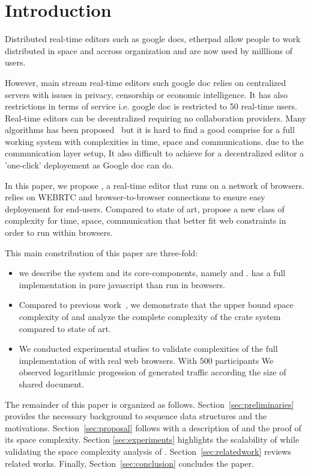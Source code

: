 
\section{Introduction}

Distributed real-time editors such as google docs, etherpad allow
people to work distributed in space and accross organization and are
now used by milllions of users. 

However, main stream real-time editors such google doc relies on
centralized servers with issues in privacy, censorship or economic
intelligence. It has also restrictions in terms of service i.e. google
doc is restricted to 50 real-time users. 
%
Real-time editors can be decentralized requiring no collaboration
providers. Many algorithms has been proposed~\cite{sun1998operational,
  sun2009contextbased,woot} but it is hard to find a good comprise for
a full working system with complexities in time, space and
communications. due to the communication layer setup, It also
difficult to achieve for a decentralized editor a 'one-click'
deployement as Google doc can do.

In this paper, we propose \CRATE, a real-time editor that runs on a
network of browsers. \CRATE relies on WEBRTC and browser-to-browser
connections to ensure easy deployement for end-users. Compared to
state of art, \CRATE propose a new class of complexity for time,
space, communication that better fit web constraints in order to run
within browsers.

This main constribution of this paper are three-fold:
\begin{itemize}
\item we describe the \CRATE system and its core-components, namely
  \LSEQ and \SPRAY. \CRATE has a full implementation in pure
  javascript than run in browsers.
\item Compared to previous work~\cite{doceng}, we
  demonstrate that the upper bound space complexity of \CRATE and
  analyze the complete complexity of the crate system compared to
  state of art.
\item We conducted experimental studies to validate complexities of
  the full implementation of \CRATE with real web browsers. With $500$
  participants We observed logarithmic progession of generated
  traffic according the size of shared document. 
\end{itemize}

The remainder of this paper is organized as
follows. Section~\ref{sec:preliminaries} provides the necessary background to
sequence data structures and the motivations. Section~\ref{sec:proposal}
follows with a description of \LSEQ and the proof of its space
complexity. Section \ref {sec:experiments} highlights the scalability of
\CRATE while validating the space complexity analysis of
\LSEQ. Section~\ref{sec:relatedwork} reviews related works. Finally,
Section~\ref{sec:conclusion} concludes the paper.




